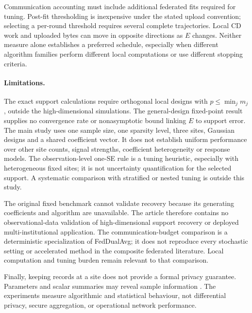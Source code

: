 Communication accounting must include additional federated fits required
for tuning. Post-fit thresholding is inexpensive under the stated upload
convention; selecting a per-round threshold requires several complete
trajectories. Local CD work and uploaded bytes can move in opposite
directions as $E$ changes. Neither measure alone establishes a preferred
schedule, especially when different algorithm families perform different
local computations or use different stopping criteria.

\paragraph{Limitations.}
The exact support calculations require orthogonal local designs with
$p\le\min_jm_j$, outside the high-dimensional simulations. The
general-design fixed-point result supplies no convergence rate or
nonasymptotic bound linking $E$ to support error. The main study uses one
sample size, one sparsity level, three sites, Gaussian designs and a shared
coefficient vector. It does not establish uniform performance over other
site counts, signal strengths, coefficient heterogeneity or response models.
The observation-level one-SE rule is a tuning heuristic, especially with
heterogeneous fixed sites; it is not uncertainty quantification for the
selected support. A systematic comparison with stratified or nested tuning
is outside this study.

The original fixed benchmark cannot validate recovery because its generating
coefficients and algorithm are unavailable. The article therefore contains
no observational-data validation of high-dimensional support recovery or
deployed multi-institutional application. The
communication-budget comparison is a deterministic specialization of
FedDualAvg; it does not reproduce every stochastic setting or accelerated
method in the composite federated literature. Local computation and tuning
burden remain relevant to that comparison.

Finally, keeping records at a site does not provide a formal privacy
guarantee. Parameters and scalar summaries may reveal sample information
\citep{zhu2021}. The experiments measure algorithmic and statistical
behaviour, not differential privacy, secure aggregation, or operational
network performance.
